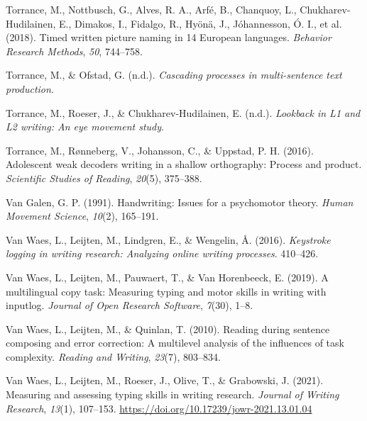\documentclass[
  man,floatsintext]{apa7}
\newlength{\cslhangindent}
\newlength{\cslentryspacingunit} %
\newenvironment{CSLReferences}[2] %
 {%
  \setlength{\parindent}{0pt}
  \ifodd #1
  \let\oldpar\par
  \def\par{\hangindent=\cslhangindent\oldpar}
  \fi
  \setlength{\parskip}{#2\cslentryspacingunit}
 }%
 {}
\begin{document}
\begin{CSLReferences}{1}{0}
\leavevmode{}%
Torrance, M., Nottbusch, G., Alves, R. A., Arfé, B., Chanquoy, L., Chukharev-Hudilainen, E., Dimakos, I., Fidalgo, R., Hyönä, J., Jóhannesson, Ó. I., et al. (2018). Timed written picture naming in 14 {E}uropean languages. \emph{Behavior Research Methods}, \emph{50}, 744--758.

\leavevmode{}%
Torrance, M., \& Ofstad, G. (n.d.). \emph{Cascading processes in multi-sentence text production}.

\leavevmode{}%
Torrance, M., Roeser, J., \& Chukharev-Hudilainen, E. (n.d.). \emph{Lookback in {L1 and L2} writing: An eye movement study}.

\leavevmode{}%
Torrance, M., Rønneberg, V., Johansson, C., \& Uppstad, P. H. (2016). Adolescent weak decoders writing in a shallow orthography: Process and product. \emph{Scientific Studies of Reading}, \emph{20}(5), 375--388.

\leavevmode{}%
Van Galen, G. P. (1991). Handwriting: Issues for a psychomotor theory. \emph{Human Movement Science}, \emph{10}(2), 165--191.

\leavevmode{}%
Van Waes, L., Leijten, M., Lindgren, E., \& Wengelin, Å. (2016). \emph{Keystroke logging in writing research: Analyzing online writing processes}. 410--426.

\leavevmode{}%
Van Waes, L., Leijten, M., Pauwaert, T., \& Van Horenbeeck, E. (2019). A multilingual copy task: Measuring typing and motor skills in writing with inputlog. \emph{Journal of Open Research Software}, \emph{7}(30), 1--8.

\leavevmode{}%
Van Waes, L., Leijten, M., \& Quinlan, T. (2010). Reading during sentence composing and error correction: A multilevel analysis of the influences of task complexity. \emph{Reading and Writing}, \emph{23}(7), 803--834.

\leavevmode{}%
Van Waes, L., Leijten, M., Roeser, J., Olive, T., \& Grabowski, J. (2021). Measuring and assessing typing skills in writing research. \emph{Journal of Writing Research}, \emph{13}(1), 107--153. \url{https://doi.org/10.17239/jowr-2021.13.01.04}


\end{CSLReferences}
\end{document}
